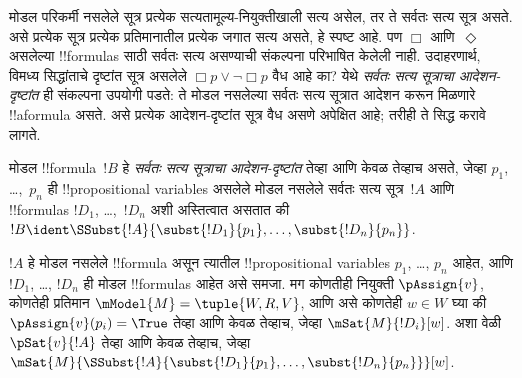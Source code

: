 \documentclass[../../../include/open-logic-section]{subfiles}
\begin{document}


\begin{explain}
मोडल परिकर्मी नसलेले सूत्र प्रत्येक सत्यतामूल्य-नियुक्तीखाली
सत्य असेल, तर ते सर्वतः सत्य सूत्र असते. असे प्रत्येक सूत्र
प्रत्येक प्रतिमानातील प्रत्येक जगात सत्य असते, हे स्पष्ट आहे.
पण $\Box$ आणि~$\Diamond$ असलेल्या !!{formula}s साठी
सर्वतः सत्य असण्याची संकल्पना परिभाषित केलेली नाही.
उदाहरणार्थ, विमध्य सिद्धांताचे दृष्टांत सूत्र असलेले
$\Box p \lor \lnot \Box p$ वैध आहे का? येथे
\emph{सर्वतः सत्य सूत्राचा आदेशन-दृष्टांत} ही
संकल्पना उपयोगी पडते: ते मोडल नसलेल्या सर्वतः सत्य
सूत्रात आदेशन करून मिळणारे !!a{formula} असते. असे
प्रत्येक आदेशन-दृष्टांत सूत्र वैध असणे अपेक्षित आहे;
तरीही ते सिद्ध करावे लागते.
\end{explain}

\begin{defn}
  मोडल !!{formula}~$!B$ हे \emph{सर्वतः सत्य सूत्राचा
  आदेशन-दृष्टांत} तेव्हा आणि केवळ तेव्हाच असते,
  जेव्हा $p_1$, \dots,~$p_n$ ही !!{propositional
    variable}s असलेले मोडल नसलेले सर्वतः सत्य सूत्र~$!A$
  आणि !!{formula}s $!D_1$, \dots,~$!D_n$ अशी अस्तित्वात
  असतात की $!B \ident \SSubst{!A}{\subst{!D_1}{p_1},
    \dots, \subst{!D_n}{p_n}}$.
\end{defn}

\begin{lem}
  $!A$ हे मोडल नसलेले !!{formula} असून त्यातील
  !!{propositional
  variable}s $p_1$, \dots, $p_n$ आहेत,
  आणि $!D_1$, \dots, $!D_n$ ही मोडल !!{formula}s आहेत असे
  समजा. मग कोणतीही नियुक्ती $\pAssign{v}$, कोणतेही प्रतिमान
  $\mModel{M} = \tuple{W, R, V}$, आणि असे कोणतेही $w \in W$
  घ्या की $\pAssign{v}(p_i) = \True$ तेव्हा आणि केवळ तेव्हाच,
  जेव्हा $\mSat{M}{!D_i}[w]$. अशा वेळी $\pSat{v}{!A}$
  तेव्हा आणि केवळ तेव्हाच, जेव्हा
  $\mSat{M}{\SSubst{!A}{\subst{!D_1}{p_1}, \dots,
      \subst{!D_n}{p_n}}}[w]$.
\end{lem}
\end{document}
